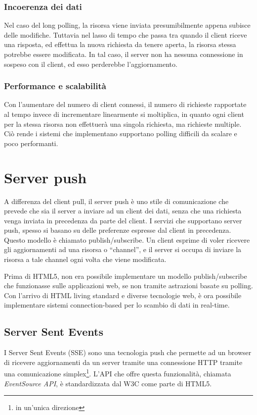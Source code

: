 \documentclass[12pt,a4paper,openright]{report}
\begin{document}
\subsubsection{Incoerenza dei dati}
Nel caso del long polling, la risorsa viene inviata presumibilmente appena subisce delle modifiche. Tuttavia nel lasso di tempo che passa tra quando il client riceve una risposta, ed effettua la nuova richiesta da tenere aperta, la risorsa stessa potrebbe essere modificata. In tal caso, il server non ha nessuna connessione in sospeso con il client, ed esso perderebbe l’aggiornamento. 

\subsubsection{Performance e scalabilità}
Con l’aumentare del numero di client connessi, il numero di richieste rapportate al tempo invece di incrementare linearmente si moltiplica, in quanto ogni client per la stessa risorsa non effettuerà una singola richiesta, ma richieste multiple. Ciò rende i sistemi che implementano supportano polling difficili da scalare e poco performanti.

\section{Server push}\label{sec_serverpush}
A differenza del client pull, il server push è uno stile di comunicazione che prevede che sia il server a inviare ad un client dei dati, senza che una richiesta venga inviata in precedenza da parte del client. I servizi che supportano server push, spesso si basano su delle preferenze espresse dal client in precedenza. Questo modello è chiamato publish/subscribe. Un client esprime di voler ricevere gli aggiornamenti ad una risorsa o “channel”, e il server si occupa di inviare la risorsa a tale channel ogni volta che viene modificata.

\bigskip

Prima di HTML5, non era possibile implementare un modello publish/subscribe che funzionasse sulle applicazioni web, se non tramite astrazioni basate su polling. Con l’arrivo di HTML living standard e diverse tecnologie web, è ora possibile implementare sistemi connection-based per lo scambio di dati in real-time.

\subsection{Server Sent Events}
I Server Sent Events (SSE) sono una tecnologia push che permette ad un browser di ricevere aggiornamenti da un server tramite una connessione HTTP tramite una comunicazione simplex\footnote{in un'unica direzione}. L'API che offre questa funzionalità, chiamata \textit{EventSource API}, è standardizzata dal W3C come parte di HTML5.
\end{document}
